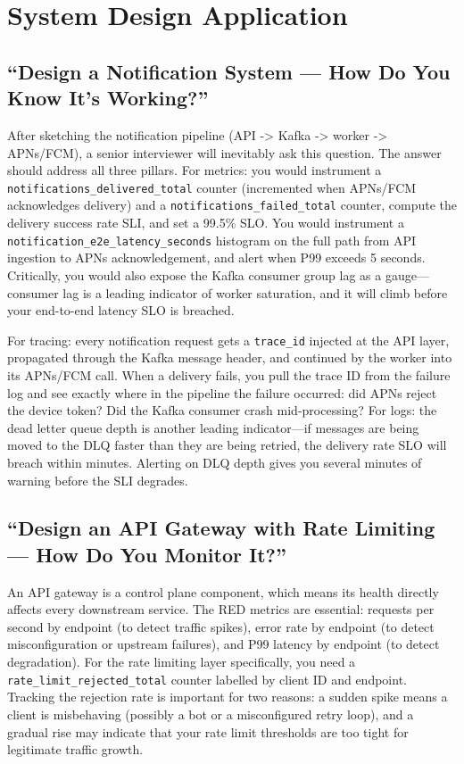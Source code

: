 \documentclass[11pt,a4paper]{article}
\begin{document}
\section{System Design Application}

\subsection{``Design a Notification System --- How Do You Know It's Working?''}

After sketching the notification pipeline (API -> Kafka -> worker -> APNs/FCM), a senior interviewer will inevitably ask this question. The answer should address all three pillars. For metrics: you would instrument a \texttt{notifications\_delivered\_total} counter (incremented when APNs/FCM acknowledges delivery) and a \texttt{notifications\_failed\_total} counter, compute the delivery success rate SLI, and set a 99.5\% SLO. You would instrument a \texttt{notification\_e2e\_latency\_seconds} histogram on the full path from API ingestion to APNs acknowledgement, and alert when P99 exceeds 5 seconds. Critically, you would also expose the Kafka consumer group lag as a gauge---consumer lag is a leading indicator of worker saturation, and it will climb before your end-to-end latency SLO is breached.

For tracing: every notification request gets a \texttt{trace\_id} injected at the API layer, propagated through the Kafka message header, and continued by the worker into its APNs/FCM call. When a delivery fails, you pull the trace ID from the failure log and see exactly where in the pipeline the failure occurred: did APNs reject the device token? Did the Kafka consumer crash mid-processing? For logs: the dead letter queue depth is another leading indicator---if messages are being moved to the DLQ faster than they are being retried, the delivery rate SLO will breach within minutes. Alerting on DLQ depth gives you several minutes of warning before the SLI degrades.

\subsection{``Design an API Gateway with Rate Limiting --- How Do You Monitor It?''}

An API gateway is a control plane component, which means its health directly affects every downstream service. The RED metrics are essential: requests per second by endpoint (to detect traffic spikes), error rate by endpoint (to detect misconfiguration or upstream failures), and P99 latency by endpoint (to detect degradation). For the rate limiting layer specifically, you need a \texttt{rate\_limit\_rejected\_total} counter labelled by client ID and endpoint. Tracking the rejection rate is important for two reasons: a sudden spike means a client is misbehaving (possibly a bot or a misconfigured retry loop), and a gradual rise may indicate that your rate limit thresholds are too tight for legitimate traffic growth.
\end{document}
